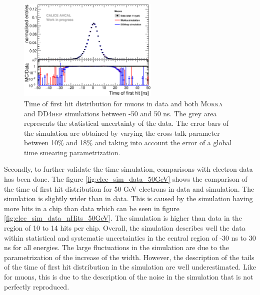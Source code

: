 \documentclass{JINST}
\newcommand\mokka{\textsc{Mokka}\xspace}
\newcommand\ddhep{\textsc{DD4hep}\xspace}
\begin{document}
\begin{figure}[htbp!]
  \centering
  \includegraphics[width=0.6\textwidth]{fig/Comparison_MokkaDD4hepData_Muons.eps}
  \caption{Time of first hit distribution for muons in data and both \mokka and \ddhep simulations between -50 and 50 ns. The grey area represents the statistical uncertainty of the data. The error bars of the simulation are obtained by varying the cross-talk parameter between 10\% and 18\% and taking into account the error of a global time smearing parametrization.}
  \label{fig:sim_data_muon}
\end{figure}

Secondly, to further validate the time simulation, comparisons with electron data has been done. The figure \ref{fig:elec_sim_data_50GeV} shows the comparison of the time of first hit distribution for 50 GeV electrons in data and simulation. The simulation is slightly wider than in data. This is caused by the simulation having more hits in a chip than data which can be seen in figure \ref{fig:elec_sim_data_nHits_50GeV}. The simulation is higher than data in the region of 10 to 14 hits per chip. Overall, the simulation describes well the data within statistical and systematic uncertainties in the central region of -30 ns to 30 ns for all energies. The large fluctuations in the simulation are due to the parametrization of the increase of the width. However, the description of the tails of the time of first hit distribution in the simulation are well underestimated. Like for muons, this is due to the description of the noise in the simulation that is not perfectly reproduced.
\end{document}
